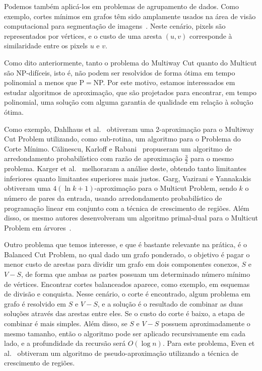 \documentclass[12pt, a4paper]{article}
\begin{document}
Podemos também aplicá-los em problemas de agrupamento de dados. Como exemplo, cortes mínimos em grafos têm sido amplamente usados na área de visão computacional para segmentação de imagens~\cite{BT1999, KSARS2011}.
Neste cenário, pixels são representados por vértices, e o custo de uma aresta $(u, v)$ corresponde à similaridade entre os pixels $u$ e $v$.

Como dito anteriormente, tanto o problema do Multiway Cut quanto do Multicut são NP-difíceis, isto é, não podem ser resolvidos de forma ótima em tempo polinomial a menos que P$=$NP. Por este motivo, estamos interessados em estudar algoritmos de aproximação, que são projetados para encontrar, em tempo polinomial, uma solução com alguma garantia de qualidade em relação à solução ótima.

%
%
Como exemplo, Dahlhaus et al.~\cite{DJPSY1994} obtiveram uma 2-aproximação para o Multiway Cut Problem utilizando, como sub-rotina, um algoritmo para o Problema do Corte Mínimo. 
Călinescu, Karloff e Rabani~\cite{CKR2000} propuseram um algoritmo de arredondamento probabilístico com razão de aproximação $\frac{3}{2}$ para o mesmo problema.
Karger et al.~\cite{KKSY2004} melhoraram a análise deste, obtendo tanto limitantes inferiores quanto limitantes superiores mais justos. Garg, Vazirani e Yannakakis~\cite{GVY1996} obtiveram uma $4 (\ln k + 1)$-aproximação para o Multicut Problem, sendo $k$ o número de pares da entrada, usando arredondamento probabilístico de programação linear em conjunto com a técnica de crescimento de regiões. Além disso, os mesmo autores desenvolveram um algoritmo primal-dual para o Multicut Problem em árvores~\cite{GVY1997}.

Outro problema que temos interesse, e que é bastante relevante na prática, é o Balanced Cut Problem, no qual dado um grafo ponderado,
o objetivo é pagar o menor custo de arestas para dividir um grafo em dois componentes conexos, $S$ e $V-S$, de forma que ambas as partes possuam um determinado número mínimo de vértices.
Encontrar cortes balanceados aparece, como exemplo, em esquemas de divisão e conquista. Nesse cenário, o corte é encontrado, algum problema em grafo é resolvido em $S$ e $V-S$, e a solução é o resultado de combinar as duas soluções através das arestas entre eles. Se o custo do corte é baixo, a etapa de combinar é mais simples. Além disso, se $S$ e $V-S$ possuem aproximadamente o mesmo tamanho, então o algoritmo pode ser aplicado recursivamente em cada lado, e a profundidade da recursão será $O(\log n)$.
Para este problema, Even et al.~\cite{ENRS1999} obtiveram um algoritmo de pseudo-aproximação utilizando a técnica de crescimento de regiões. 
\end{document}
